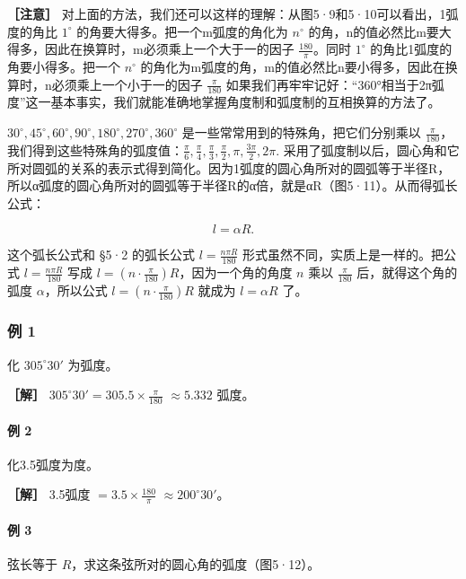 \textbf{［注意］}
对上面的方法，我们还可以这样的理解：从图5·9和5·10可以看出，1弧度的角比
\(1^{\circ}\) 的角要大得多。把一个m弧度的角化为 \(n^{\circ}\)
的角，n的值必然比m要大得多，因此在换算时，m必须乘上一个大于一的因子
\(\frac{180}{\pi}\)。同时 \(1^{\circ}\) 的角比1弧度的角要小得多。把一个
\(n^{\circ}\)
的角化为m弧度的角，m的值必然比n要小得多，因此在换算时，n必须乘上一个小于一的因子
\(\frac{\pi}{180}\)
如果我们再牢牢记好：``360°相当于2π弧度''这一基本事实，我们就能准确地掌握角度制和弧度制的互相换算的方法了。

\(30^{\circ}, 45^{\circ}, 60^{\circ}, 90^{\circ}, 180^{\circ}, 270^{\circ}, 360^{\circ}\)
是一些常常用到的特殊角，把它们分别乘以
\(\frac{\pi}{180}\)，我们得到这些特殊角的弧度值：\(\frac{\pi}{6}, \frac{\pi}{4}, \frac{\pi}{3}, \frac{\pi}{2}, \pi, \frac{3\pi}{2}, 2\pi.\)
采用了弧度制以后，圆心角和它所对圆弧的关系的表示式得到简化。因为1弧度的圆心角所对的圆弧等于半径R，所以α弧度的圆心角所对的圆弧等于半径R的α倍，就是αR（图5·11）。从而得弧长公式：

\[
l = \alpha R.
\]

这个弧长公式和 §5·2 的弧长公式 \(l=\frac{n\pi R}{180}\)
形式虽然不同，实质上是一样的。把公式 \(l=\frac{n\pi R}{180}\) 写成
\(l=\left(n\cdot\frac{\pi}{180}\right)R\)，因为一个角的角度 \(n\) 乘以
\(\frac{\pi}{180}\) 后，就得这个角的弧度 \(\alpha\)，所以公式
\(l=\left(n\cdot\frac{\pi}{180}\right)R\) 就成为 \(l=\alpha R\) 了。

\subsubsection{例 1}

化 \(305^{\circ}30'\) 为弧度。

\textbf{［解］} \(305^{\circ}30' = 305.5 \times \frac{\pi}{180}\)
\(\approx 5.332\) 弧度。

\paragraph{例 2}

化3.5弧度为度。

\textbf{［解］} 3.5弧度 \(= 3.5 \times \frac{180}{\pi}\)
\(\approx 200^{\circ}30'\)。

\paragraph{例 3}

弦长等于 \(R\)，求这条弦所对的圆心角的弧度（图5·12）。

